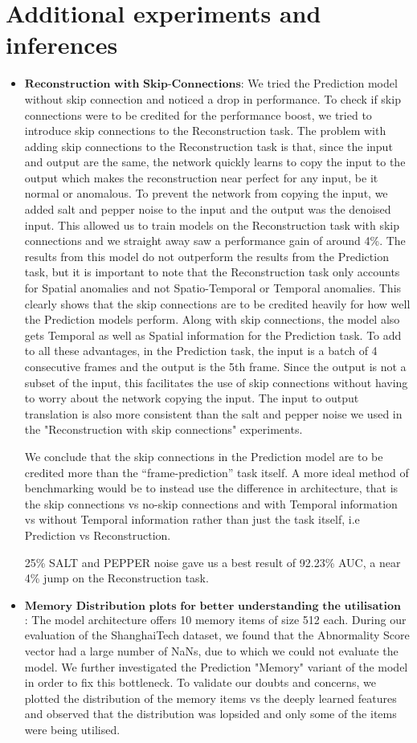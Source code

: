 \section{Additional experiments and inferences}
\begin{itemize}
    \item $\textbf{Reconstruction with Skip-Connections}$: We tried the Prediction model without skip connection and noticed a drop in performance. To check if skip connections were to be credited for the performance boost, we tried to introduce skip connections to the Reconstruction task. The problem with adding skip connections to the Reconstruction task is that, since the input and output are the same, the network quickly learns to copy the input to the output which makes the reconstruction near perfect for any input, be it normal or anomalous. To prevent the network from copying the input, we added salt and pepper noise to the input and the output was the denoised input. This allowed us to train models on the Reconstruction task with skip connections and we straight away saw a performance gain of around 4\%. The results from this model do not outperform the results from the Prediction task, but it is important to note that the Reconstruction task only accounts for Spatial anomalies and not Spatio-Temporal or Temporal anomalies. This clearly shows that the skip connections are to be credited heavily for how well the Prediction models perform. Along with skip connections, the model also gets Temporal as well as Spatial information for the Prediction task. To add to all these advantages, in the Prediction task, the input is a batch of 4 consecutive frames and the output is the 5th frame. Since the output is not a subset of the input, this facilitates the use of skip connections without having to worry about the network copying the input. The input to output translation is also more consistent than the salt and pepper noise we used in the "Reconstruction with skip connections" experiments.
    
    We conclude that the skip connections in the Prediction model are to be credited more than the “frame-prediction” task itself. A more ideal method of benchmarking would be to instead use the difference in architecture, that is the skip connections vs no-skip connections and with Temporal information vs without Temporal information  rather than just the task itself, i.e Prediction vs Reconstruction. 

    25\% SALT and PEPPER noise gave us a best result of 92.23\% AUC, a near 4\% jump on the Reconstruction task. 
    \item $\textbf{Memory Distribution plots for better understanding the utilisation of memory}$: The model architecture offers 10 memory items of size 512 each. During our evaluation of the ShanghaiTech dataset\cite{Luo2017ARO}, we found that the Abnormality Score vector had a large number of NaNs, due to which we could not evaluate the model. We further investigated the Prediction "Memory" variant of the model in order to fix this bottleneck. To validate our doubts and concerns, we plotted the distribution of the memory items vs the deeply learned features and observed that the distribution was lopsided and only some of the items were being utilised. 
 

\end{itemize}
